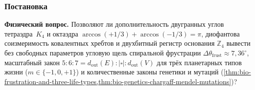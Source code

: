 \label{exp:ceb02}

\subsubsection*{Постановка}
\textbf{Физический вопрос.}
Позволяют ли дополнительность двугранных углов тетраэдра~$K_4$ и октаэдра $\arccos(+1/3)+\arccos(-1/3)=\pi$, диофантова соизмеримость ковалентных хребтов и двухбитный регистр основания $\mathbb{Z}_4$ вывести без свободных параметров угловую щель спиральной фрустрации $\Delta\theta_{\mathrm{frust}} \approx 7{,}36^\circ$, масштабный закон $5:6:7 = d_{\mathrm{out}}(E) : |\square| : d_{\mathrm{out}}(V)$ для трёх планетарных типов жизни ($m \in \{-1,0,+1\}$) и количественные законы генетики и мутаций (\cref{thm:bio-frustration-and-three-life-types,thm:bio-genetics-chargaff-mendel-mutations})?

